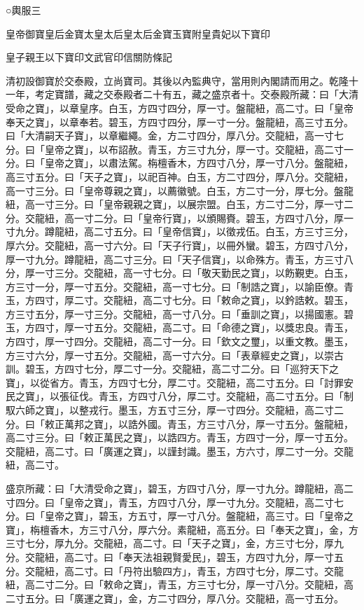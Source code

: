 
\begin{pinyinscope}
○輿服三

皇帝御寶皇后金寶太皇太后皇太后金寶玉寶附皇貴妃以下寶印

皇子親王以下寶印文武官印信關防條記

清初設御寶於交泰殿，立尚寶司。其後以內監典守，當用則內閣請而用之。乾隆十一年，考定寶譜，藏之交泰殿者二十有五，藏之盛京者十。交泰殿所藏：曰「大清受命之寶」，以章皇序。白玉，方四寸四分，厚一寸。盤龍紐，高二寸。曰「皇帝奉天之寶」，以章奉若。碧玉，方四寸四分，厚一寸一分。盤龍紐，高三寸五分。曰「大清嗣天子寶」，以章繼繩。金，方二寸四分，厚八分。交龍紐，高一寸七分。曰「皇帝之寶」，以布詔赦。青玉，方三寸九分，厚一寸。交龍紐，高二寸一分。曰「皇帝之寶」，以肅法駕。栴檀香木，方四寸八分，厚一寸八分。盤龍紐，高三寸五分。曰「天子之寶」，以祀百神。白玉，方二寸四分，厚八分。交龍紐，高一寸三分。曰「皇帝尊親之寶」，以薦徽號。白玉，方二寸一分，厚七分。盤龍紐，高一寸三分。曰「皇帝親親之寶」，以展宗盟。白玉，方二寸二分，厚一寸二分。交龍紐，高一寸二分。曰「皇帝行寶」，以頒賜賚。碧玉，方四寸八分，厚一寸九分。蹲龍紐，高二寸五分。曰「皇帝信寶」，以徵戎伍。白玉，方三寸三分，厚六分。交龍紐，高一寸六分。曰「天子行寶」，以冊外蠻。碧玉，方四寸八分，厚一寸九分。蹲龍紐，高二寸三分。曰「天子信寶」，以命殊方。青玉，方三寸八分，厚一寸三分。交龍紐，高一寸七分。曰「敬天勤民之寶」，以飭覲吏。白玉，方三寸一分，厚一寸五分。交龍紐，高一寸七分。曰「制誥之寶」，以諭臣僚。青玉，方四寸，厚二寸。交龍紐，高二寸七分。曰「敕命之寶」，以鈐誥敕。碧玉，方三寸五分，厚一寸三分。交龍紐，高一寸八分。曰「垂訓之寶」，以揚國憲。碧玉，方四寸，厚一寸五分。交龍紐，高二寸。曰「命德之寶」，以獎忠良。青玉，方四寸，厚一寸四分。交龍紐，高二寸一分。曰「欽文之璽」，以重文教。墨玉，方三寸六分，厚一寸五分。交龍紐，高一寸六分。曰「表章經史之寶」，以崇古訓。碧玉，方四寸七分，厚二寸一分。交龍紐，高二寸二分。曰「巡狩天下之寶」，以從省方。青玉，方四寸七分，厚二寸。交龍紐，高二寸五分。曰「討罪安民之寶」，以張征伐。青玉，方四寸八分，厚二寸。交龍紐，高二寸五分。曰「制馭六師之寶」，以整戎行。墨玉，方五寸三分，厚一寸四分。交龍紐，高二寸二分。曰「敕正萬邦之寶」，以誥外國。青玉，方三寸八分，厚一寸五分。盤龍紐，高二寸三分。曰「敕正萬民之寶」，以誥四方。青玉，方四寸一分，厚一寸五分。交龍紐，高二寸。曰「廣運之寶」，以謹封識。墨玉，方六寸，厚二寸一分。交龍紐，高二寸。

盛京所藏：曰「大清受命之寶」，碧玉，方四寸八分，厚一寸九分。蹲龍紐，高二寸四分。曰「皇帝之寶」，青玉，方四寸八分，厚一寸九分。交龍紐，高二寸七分。曰「皇帝之寶」，碧玉，方五寸，厚一寸八分。盤龍紐，高三寸。曰「皇帝之寶」，栴檀香木，方三寸八分，厚六分。素龍紐，高五分。曰「奉天之寶」，金，方三寸七分，厚九分。交龍紐，高二寸。曰「天子之寶」，金，方三寸七分，厚九分。交龍紐，高二寸。曰「奉天法祖親賢愛民」，碧玉，方四寸九分，厚一寸五分。交龍紐，高二寸。曰「丹符出驗四方」，青玉，方四寸七分，厚二寸。交龍紐，高二寸二分。曰「敕命之寶」，青玉，方三寸七分，厚一寸八分。交龍紐，高二寸五分。曰「廣運之寶」，金，方二寸四分，厚八分。交龍紐，高一寸五分。


\end{pinyinscope}
